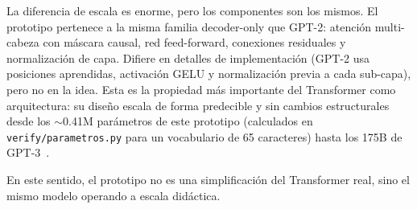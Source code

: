 La diferencia de escala es enorme, pero los componentes son los mismos.
El prototipo pertenece a la misma familia decoder-only que GPT-2: atención
multi-cabeza con máscara causal, red feed-forward, conexiones residuales y
normalización de capa. Difiere en detalles de implementación (GPT-2 usa
posiciones aprendidas, activación GELU y normalización previa a cada
sub-capa), pero no en la idea. Esta es la propiedad más importante del
Transformer como arquitectura: su diseño escala de forma predecible y sin
cambios estructurales desde los $\sim$0.41M parámetros de este prototipo
(calculados en \texttt{verify/parametros.py} para un vocabulario de 65
caracteres) hasta los 175B de GPT-3~\cite{vaswani2017attention}.

En este sentido, el prototipo no es una simplificación del Transformer
real, sino el mismo modelo operando a escala didáctica.
